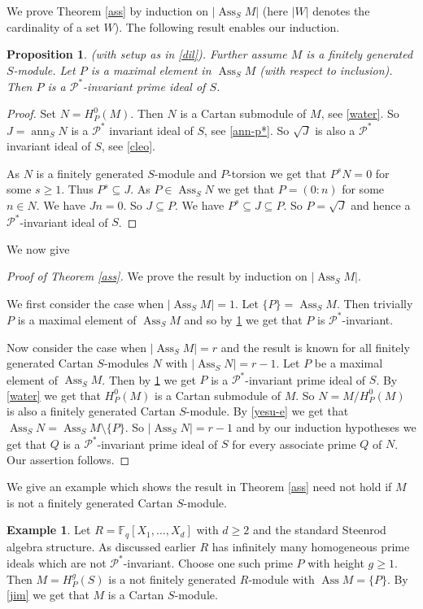 \documentclass{amsart}
\newcommand{\F}{\mathbb{F} }
\newcommand{\Pc}{\mathcal{P} }
\newcommand{\ann}{\operatorname{ann}}
\newcommand{\Ass}{\operatorname{Ass}}
\theoremstyle{plain}
\newtheorem{proposition}[theorem]{Proposition}
\theoremstyle{definition}
\newtheorem{example}[theorem]{Example}
\theoremstyle{remark}
\begin{document}
We prove Theorem \ref{ass} by induction on $|\Ass_S M|$ (here $|W|$ denotes the cardinality of a set $W$).
The following result enables our induction.
\begin{proposition}
  \label{utah}(with setup as in \ref{dil}). Further assume $M$ is a finitely generated $S$-module. Let $P$ is a maximal element in $\Ass_S M$ (with respect to inclusion). Then $P$ is a $\Pc^*$-invariant prime ideal of $S$.
\end{proposition}
\begin{proof}
  Set $N = H^0_P(M)$. Then $N$ is a Cartan submodule of $M$, see \ref{water}. So $J = \ann_S N$ is a $\Pc^*$ invariant ideal of $S$, see \ref{ann-p*}. So $\sqrt{J}$ is also a $\Pc^*$ invariant ideal of $S$, see \ref{cleo}. 
  
  As $N$ is a finitely generated $S$-module and $P$-torsion we get that $P^sN = 0$ for some $s \geq 1$. Thus $P^s \subseteq J$.
  As $P \in \Ass_S N$ we get that $P = (0 \colon n) $ for some $n \in N$. We have $Jn = 0$. So $J \subseteq P$.
  We have $P^s \subseteq J \subseteq P$. So $P = \sqrt{J}$ and hence a $\Pc^*$-invariant ideal of $S$.
\end{proof}
We now give
\begin{proof}[Proof of Theorem \ref{ass}] We prove the result by induction on $|\Ass_S M|$.

We first consider the case when $|\Ass_S M| = 1$. Let $\{ P \} = \Ass_S M$. Then trivially $P$ is a maximal element of $\Ass_S M$ and so by \ref{utah} we get that $P$ is $\Pc^*$-invariant.

Now consider the case when $|\Ass_S M| = r$ and the result is known for all finitely generated Cartan $S$-modules $N$ with $|\Ass_S N| = r -1$.
Let $P$ be a maximal element of $\Ass_S M$. Then by \ref{utah} we get $P$ is a $\Pc^*$-invariant prime ideal of $S$. By \ref{water} we get that $H^0_P(M)$ is a Cartan submodule of $M$. So $N = M/H^0_P(M)$ is also a finitely generated Cartan $S$-module. By \ref{yesu-e} we get that $\Ass_S N = \Ass_S M \setminus \{P \}$. So $|\Ass_S N| = r -1$ and by our induction hypotheses we get that $Q$ is a $\Pc^*$-invariant prime ideal of $S$ for every associate prime $Q$ of $N$. Our assertion follows.
\end{proof}
We give an example which shows the result in Theorem \ref{ass} need not hold if $M$ is not a finitely generated Cartan $S$-module.
\begin{example}\label{non-ass}
  Let $R = \F_q[X_1, \ldots, X_d]$ with $d \geq 2$ and the standard Steenrod algebra structure. As discussed earlier $R$ has infinitely many  homogeneous prime ideals which are not $\Pc^*$-invariant. Choose one such prime $P$ with height $g \geq 1$. Then $M = H^g_P(S)$ is a not finitely generated $R$-module with $\Ass M = \{ P\}$. By \ref{jim}
  we get that $M$ is a Cartan $S$-module.
\end{example}
\end{document}
